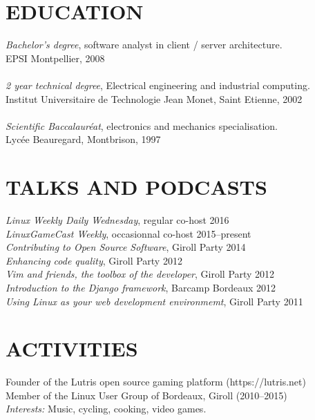 \documentclass[margin]{res}
\begin{document}
\begin{resume}
\section{EDUCATION}
    {\sl Bachelor's degree}, software analyst in client / server architecture.\\
            EPSI Montpellier, 2008\\ \\
    {\sl 2 year technical degree}, Electrical engineering and  industrial computing.\\
            Institut Universitaire de Technologie Jean Monet, Saint Etienne, 2002\\ \\
    {\sl Scientific Baccalaur\'{e}at}, electronics and mechanics specialisation.\\
            Lyc\'{e}e Beauregard, Montbrison, 1997

\section{TALKS AND PODCASTS}
    {\sl Linux Weekly Daily Wednesday}, regular co-host \hfill 2016 \\
    {\sl LinuxGameCast Weekly}, occasionnal co-host \hfill 2015--present \\
    {\sl Contributing to Open Source Software}, Giroll Party \hfill 2014 \\
    {\sl Enhancing code quality}, Giroll Party \hfill 2012 \\
    {\sl Vim and friends, the toolbox of the developer}, Giroll Party \hfill 2012 \\
    {\sl Introduction to the Django framework}, Barcamp Bordeaux \hfill 2012 \\
    {\sl Using Linux as your web development environmemt}, Giroll Party \hfill 2011

\section{ACTIVITIES}
    Founder of the Lutris open source gaming platform (https://lutris.net)\\
Member of the Linux User Group of Bordeaux, Giroll (2010--2015)\\
    {\sl Interests:\/} Music, cycling, cooking, video games.

\end{resume}
\end{document}
